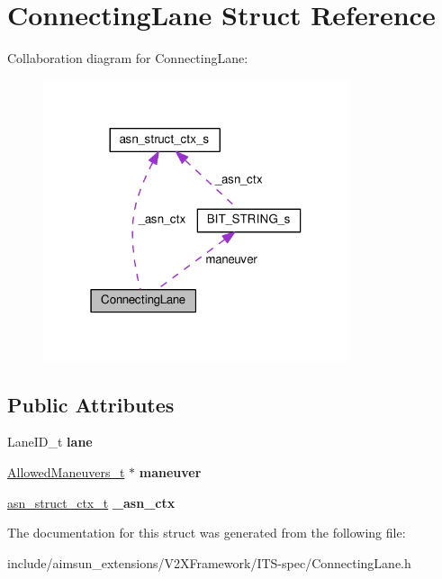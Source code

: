 \hypertarget{structConnectingLane}{}\section{Connecting\+Lane Struct Reference}
\label{structConnectingLane}


Collaboration diagram for Connecting\+Lane\+:\nopagebreak
\begin{figure}[H]
\begin{center}
\leavevmode
\includegraphics[width=255pt]{structConnectingLane__coll__graph}
\end{center}
\end{figure}
\subsection*{Public Attributes}
\begin{DoxyCompactItemize}
\item 
Lane\+I\+D\+\_\+t {\bfseries lane}\hypertarget{structConnectingLane_a28a86da9e6e5486db16650936e631859}{}\label{structConnectingLane_a28a86da9e6e5486db16650936e631859}

\item 
\hyperlink{structBIT__STRING__s}{Allowed\+Maneuvers\+\_\+t} $\ast$ {\bfseries maneuver}\hypertarget{structConnectingLane_a51be547597e5d84dfa829dcfd4c94adb}{}\label{structConnectingLane_a51be547597e5d84dfa829dcfd4c94adb}

\item 
\hyperlink{structasn__struct__ctx__s}{asn\+\_\+struct\+\_\+ctx\+\_\+t} {\bfseries \+\_\+asn\+\_\+ctx}\hypertarget{structConnectingLane_aa01b73a021a88127fd0e7fc0d2efce07}{}\label{structConnectingLane_aa01b73a021a88127fd0e7fc0d2efce07}

\end{DoxyCompactItemize}


The documentation for this struct was generated from the following file\+:\begin{DoxyCompactItemize}
\item 
include/aimsun\+\_\+extensions/\+V2\+X\+Framework/\+I\+T\+S-\/spec/Connecting\+Lane.\+h\end{DoxyCompactItemize}
